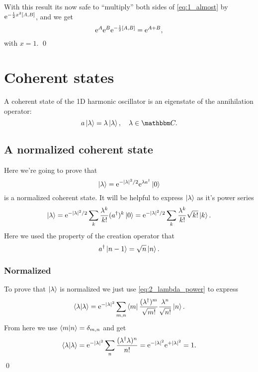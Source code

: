 \documentclass[11pt,letter, swedish, english
]{article}
\begin{document}
With this result its now safe to ``multiply'' both sides of
\eqref{eq:1_almost} by $\ee^{-\frac{1}{2}x^2\comm{A}{B}}$, and we get
\begin{equation}
\ee^{A}\ee^{B}\ee^{-\frac{1}{2}\comm{A}{B}} = \ee^{A+B},
\end{equation}
with $x=1$.
\qed


\section{Coherent states}
A coherent state of the 1D harmonic oscillator is an eigenstate of the
annihilation operator:
\begin{equation}
a\ket{\lambda}=\lambda\ket{\lambda}\qcomma
\lambda\in\C.
\end{equation}

\subsection{A normalized coherent state}
Here we're going to prove that
\begin{equation}\label{eq:2_coherent}
\ket\lambda=\mathrm{e}^{-|\lambda|^2/2}\mathrm{e}^{\lambda a^\dagger}\ket0
\end{equation}
is a normalized coherent state.
It will be helpful to express $\ket\lambda$ as it's power series
\begin{equation}\label{eq:2_lambda_power}
\ket\lambda = \mathrm{e}^{-|\lambda|^2/2}\sum_{k}
\frac{\lambda^k}{k!} (a^\dagger)^k \ket{0}
= \mathrm{e}^{-|\lambda|^2/2}\sum_{k}
\frac{\lambda^k}{k!}\sqrt{k!}\ket{k}.
\end{equation}
Here we used the property of the creation operator that
\begin{equation}
a^\dagger\ket{n-1}=\sqrt{n}\ket{n}.
\end{equation}

\subsubsection{Normalized}
To prove that $\ket\lambda$ is normalized we just use
\eqref{eq:2_lambda_power} to express
\begin{equation}
\ip{\lambda} = \ee^{-|\lambda|^2}\sum_{m, n}
\bra{m}\frac{(\lambda^\dagger)^m}{\sqrt{m!}}
\frac{\lambda^n}{\sqrt{n!}}\ket{n}.
\end{equation}
From here we use $\ip{m}{n}=\delta_{m, n}$ and get
\begin{equation}
\ip{\lambda} = \ee^{-|\lambda|^2}
\sum_n\frac{(\lambda^\dagger\lambda)^n}{n!}
=\ee^{-|\lambda|^2}\ee^{+|\lambda|^2}=1.
\end{equation}
\qed
\end{document}
